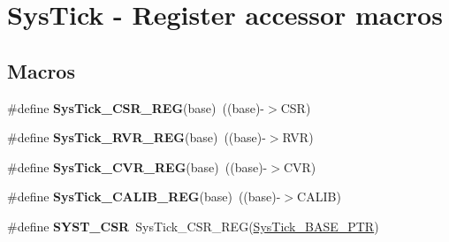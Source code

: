 \hypertarget{group___sys_tick___register___accessor___macros}{}\section{Sys\+Tick -\/ Register accessor macros}
\label{group___sys_tick___register___accessor___macros}
\subsection*{Macros}
\begin{DoxyCompactItemize}
\item 
\mbox{\label{group___sys_tick___register___accessor___macros_gaf55a190fd4086e13691f11a798185b64}} 
\#define {\bfseries Sys\+Tick\+\_\+\+C\+S\+R\+\_\+\+R\+EG}(base)~((base)-\/$>$C\+SR)
\item 
\mbox{\label{group___sys_tick___register___accessor___macros_ga40d4d1869a3c9a27daa2c8ad4649665f}} 
\#define {\bfseries Sys\+Tick\+\_\+\+R\+V\+R\+\_\+\+R\+EG}(base)~((base)-\/$>$R\+VR)
\item 
\mbox{\label{group___sys_tick___register___accessor___macros_ga359580315175ed2d0535ca1ca67f842b}} 
\#define {\bfseries Sys\+Tick\+\_\+\+C\+V\+R\+\_\+\+R\+EG}(base)~((base)-\/$>$C\+VR)
\item 
\mbox{\label{group___sys_tick___register___accessor___macros_ga49a5f3af22dff7288ad031b8b3bf1b7a}} 
\#define {\bfseries Sys\+Tick\+\_\+\+C\+A\+L\+I\+B\+\_\+\+R\+EG}(base)~((base)-\/$>$C\+A\+L\+IB)
\item 
\mbox{\label{group___sys_tick___register___accessor___macros_gab26b3fc75982181f81b185b206e897f6}} 
\#define {\bfseries S\+Y\+S\+T\+\_\+\+C\+SR}~Sys\+Tick\+\_\+\+C\+S\+R\+\_\+\+R\+EG(\hyperlink{group___sys_tick___peripheral_gaeef73642fdef722ce658e468dad877ea}{Sys\+Tick\+\_\+\+B\+A\+S\+E\+\_\+\+P\+TR})
\item 
\mbox{\label{group___sys_tick___register___accessor___macros_ga4e8efcc1f2b551dbf3cb0aae1231e380}} 

\end{DoxyCompactItemize}
